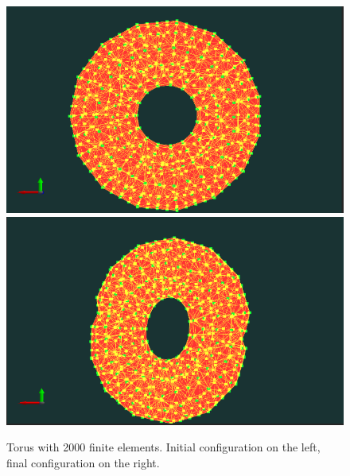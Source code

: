 \documentclass[en]{minipw} %
\begin{document}
\begin{figure}[h!]
\centering
\includegraphics[scale=0.3]{pictures/tests/2000tet.png}
\includegraphics[scale=0.3]{pictures/tests/2000end.png}
\caption[Torus with 2000 finite elements]{Torus with 2000 finite elements. Initial configuration on the left, final configuration on the right.}
\label{fig:torus2000}
\end{figure}
\end{document}
